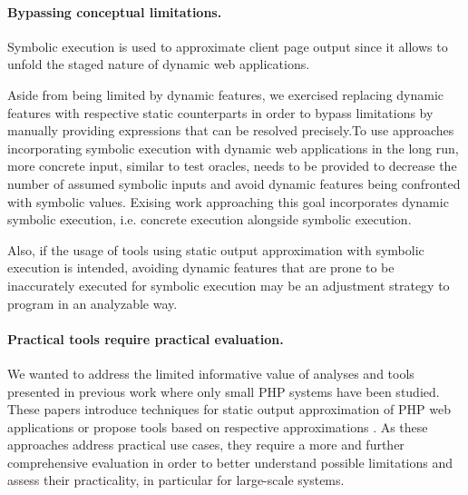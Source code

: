 \documentclass[sigconf]{acmart}
\begin{document}
\paragraph{Bypassing conceptual limitations.}
Symbolic execution is used to approximate client page output since it allows to
unfold the staged nature of dynamic web applications. 

Aside from being limited by dynamic features, we exercised replacing dynamic
features with respective static counterparts in order to bypass limitations by
manually providing expressions that can be resolved precisely.To use
approaches incorporating symbolic execution with dynamic web applications in
the long run, more concrete input, similar to test oracles, needs
to be provided to decrease the number of assumed symbolic inputs and avoid
dynamic features being confronted with symbolic values. Exising work approaching
this goal \cite{artzi_finding_2008,artzi_finding_2010,DynamicWassermann}
incorporates dynamic symbolic execution, i.e. concrete execution alongside symbolic execution.

Also, if the usage of tools using static output approximation with symbolic
execution is intended, avoiding dynamic features that are prone to be inaccurately executed for
symbolic execution  may be an adjustment strategy to program in an analyzable
way. 

\paragraph{Practical tools require practical evaluation.}
We wanted to address the limited informative value of analyses and tools
presented in previous work
\cite{Nguyen:2011:AFH:2190078.2190142,Nguyen:2014:BCG:2635868.2635928,Nguyen:2015:CPS:2786805.2786872,Nguyen:2015:VIS:2819009.2819140,minamide_static_2005,wassermann2007sound}
where only small PHP systems have been studied. These papers introduce
techniques for static output approximation of PHP web applications
\cite{minamide_static_2005,Nguyen:2014:BCG:2635868.2635928,wang_automating_2012} or propose tools
based on respective approximations
\cite{Nguyen:2011:AFH:2190078.2190142,Nguyen:2014:BCG:2635868.2635928,Nguyen:2015:CPS:2786805.2786872,Nguyen:2015:VIS:2819009.2819140,wassermann2007sound,wassermann_static_2008}.
As these approaches address practical use cases, they require a more and further comprehensive evaluation in order to  better understand possible limitations and assess their practicality, in particular for large-scale systems.
\end{document}
